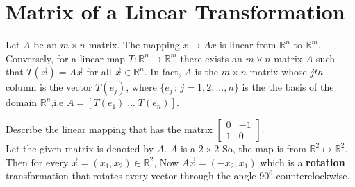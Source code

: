 \documentclass[aima104_lecturenotes_ku.tex]{subfiles}
\begin{document}
\section{Matrix of a Linear Transformation}
\begin{theorem}
  Let $A$ be an $m \times n$ matrix. The mapping $x \mapsto Ax$ is linear from $\mathbb{R}^n$ to $\mathbb{R}^m$.\\
  Conversely, for a linear map $T: \mathbb{R}^n \to \mathbb{R}^m$ there exists an $m \times n$ matrix $A$ such that $T(\vec{x})=A\vec{x}$ for all $\vec{x} \in \mathbb{R}^n$. In fact, $A$ is the $m \times n$ matrix whose $jth$ column is the vector $T(e_j)$, where $\{e_j\, : \, j=1,2,...,n\}$ is the the basis of the domain $\mathbb{R} ^n$,i.e $A= \left [ T(e_1)\; ... \; T(e_n)\right ]$.
\end{theorem}
\begin{example}
  Describe the linear mapping that has the matrix $\begin{bmatrix}
    0 & -1 \\ 1 & 0
  \end{bmatrix}$. \\[1mm]
  Let the given matrix is denoted by $A$. $A$ is a $2 \times 2$ So, the map is from $\mathbb{R}^2 \mapsto \mathbb{R}^2$. Then for every $\vec{x}=(x_1,x_2) \in \mathbb{R}^2$, Now $A\vec{x}= (-x_2,x_1)$ which is a \textbf{rotation} transformation that rotates every vector through the angle $90^0$ counterclockwise.
\end{example}
\end{document}
